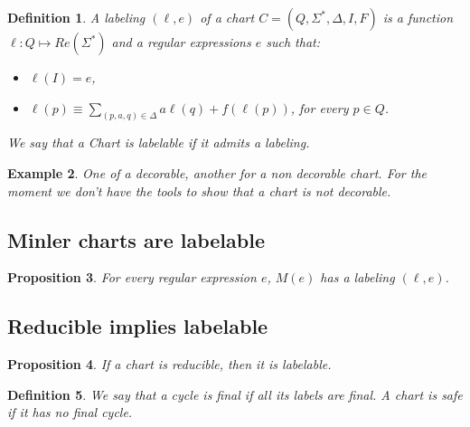 \documentclass{article}
\newtheorem{definition}{Definition}[section]
\newtheorem{proposition}[definition]{Proposition}
\newtheorem{example}[definition]{Example}
\begin{document}
\begin{definition}
A \emph{labeling} $(\ell, e)$ of a chart $C=(Q, \Sigma^*, \Delta, I, F)$ is a function 
$\ell:Q \mapsto Re(\Sigma^*)$ 
and a regular expressions $e$ such that:
\begin{itemize}
\item $\ell(I)=e$,
\item $ \ell(p)\equiv\underset{(p,a, q) \in \Delta}{\sum} a \ell(q) + f(\ell(p))$, for every $p\in Q$.
\end{itemize}
 We say that a Chart  is \emph{labelable} if it admits a labeling.
\end{definition}



\begin{example}
    One of a decorable, another for a non decorable chart. For the moment we don't have the tools to show that a chart is not decorable.
\end{example}


\subsection{Minler charts are labelable}
\begin{proposition} For every regular expression $e$, $M(e)$ has a labeling $(\ell,e)$.~\label{prop:milner-chart-is-decorable}
~\label{prop:Milner-is-decorable}\end{proposition}

\subsection{Reducible implies labelable}
\begin{proposition}
    If a chart is reducible, then it is labelable. ~\label{prop:reducible-implies-decorable}
\end{proposition}

\begin{definition}
We say that a cycle is final if all its labels are final. A chart is safe if it has no final cycle.
\end{definition}
\end{document}
